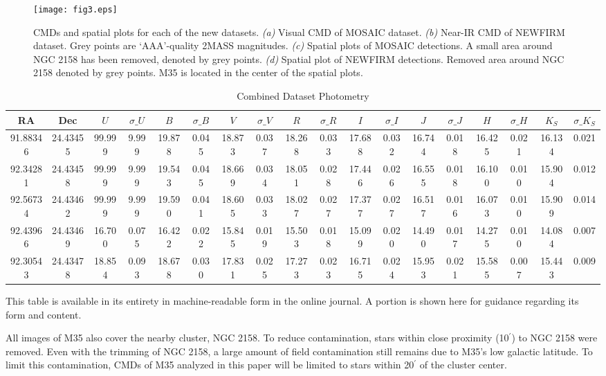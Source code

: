 \documentclass[iop]{emulateapj}
\begin{document}
\begin{figure} \centering
\texttt{[image: fig3.eps]}		%
\caption{CMDs and spatial plots for each of the new datasets. \emph{(a)} Visual CMD of MOSAIC dataset. \emph{(b)} Near-IR CMD of NEWFIRM dataset. Grey points are `AAA'-quality 2MASS magnitudes. \emph{(c)} Spatial plots of MOSAIC detections. A small area around NGC 2158 has been removed, denoted by grey points. \emph{(d)} Spatial plot of NEWFIRM detections. Removed area around NGC 2158 denoted by grey points. M35 is located in the center of the spatial plots. \label{fig:finalphot}}
\end{figure}

\begin{table}\tiny
\caption{Combined Dataset Photometry \label{tab:stubtable}}
\begin{tabular}{cccccccccccccccccc}
RA & Dec & $U$ & $\sigma\_U$ & $B$ & $\sigma\_B$ & $V$ & $\sigma\_V$ & $R$ & $\sigma\_R$ & $I$ & $\sigma\_I$ & $J$ & $\sigma\_J$ & $H$ & $\sigma\_H$ & $K_S$ & $\sigma\_K_S$ \\ \hline
   91.88346  &   24.43455 & 99.999 &  9.999 & 19.878 &  0.045 & 18.873 &  0.037 & 18.268 &  0.033 & 17.688 &  0.032 & 16.744 &  0.018 & 16.425 &  0.021 & 16.134 &  0.021 \\
   92.34281  &   24.43458 & 99.999 &  9.999 & 19.543 &  0.045 & 18.669 &  0.034 & 18.051 &  0.028 & 17.446 &  0.026 & 16.555 &  0.018 & 16.100 &  0.010 & 15.904 &  0.012 \\
   92.56734  &   24.43462 & 99.999 &  9.999 & 19.590 &  0.041 & 18.605 &  0.033 & 18.027 &  0.027 & 17.377 &  0.027 & 16.517 &  0.016 & 16.073 &  0.010 & 15.909 &  0.014 \\
   92.43966  &   24.43469 & 16.700 &  0.075 & 16.422 &  0.022 & 15.845 &  0.019 & 15.503 &  0.018 & 15.099 &  0.020 & 14.490 &  0.017 & 14.275 &  0.010 & 14.084 &  0.007 \\
   92.30543  &   24.43478 & 18.854 &  0.093 & 18.678 &  0.030 & 17.831 &  0.025 & 17.273 &  0.023 & 16.715 &  0.024 & 15.953 &  0.021 & 15.585 &  0.007 & 15.443 &  0.009 \\ \hline
\end{tabular}
{\scriptsize This table is available in its entirety in machine-readable form in the online journal. A portion is shown here for guidance regarding its form and content.}
\end{table}

All images of M35 also cover the nearby cluster, NGC 2158. To reduce contamination, stars within close proximity (10$^\prime$) to NGC 2158 were removed. Even with the trimming of NGC 2158, a large amount of field contamination still remains due to M35's low galactic latitude. To limit this contamination, CMDs of M35 analyzed in this paper will be limited to stars within 20$^\prime$ of the cluster center.
\end{document}
